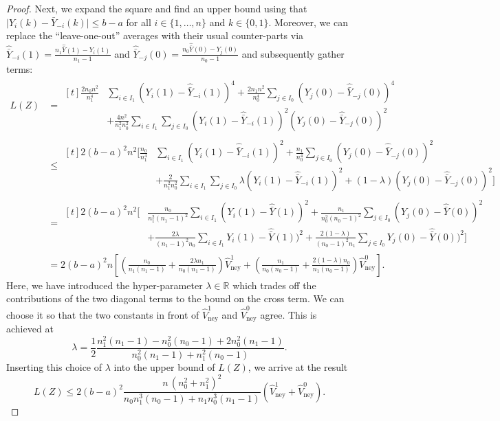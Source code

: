 \documentclass[aos]{imsart2}
\theoremstyle{plain}
\theoremstyle{definition}
\newcommand{\R}{\mathbb{R}}
\newcommand{\yb}{\bar{Y}}
\newcommand{\ybh}{\hat{\bar{Y}}}
\newcommand{\vhn}{\hat{V}_{\mathrm{ney}}}
\begin{document}
\begin{appendix}
\begin{proof}
     Next, we expand the square and find an upper bound using that $\lvert Y_i(k) - \yb_{-i}(k) \rvert \leq b-a$ for all $i \in \{1,\ldots,n\}$ and $k\in \{0,1\}$. Moreover, we can replace the ``leave-one-out'' averages with their usual counter-parts via $\ybh_{-i}(1)= \frac{n_1\ybh(1)-Y_i(1)}{n_1-1}$ and $\ybh_{-j}(0)= \frac{n_0\ybh(0)-Y_j(0)}{n_0-1}$ and subsequently gather terms:
     {\allowdisplaybreaks
    \begin{align*}
        L(Z) &= \begin{aligned}[t]
        \frac{2 n_0 n^2}{n_1^4} &\sum_{i \in I_1} (Y_i(1)-\ybh_{-i}(1))^4 + \frac{2 n_1 n^2}{n_0^4} \sum_{j \in I_0} (Y_j(0)-\ybh_{-j}(0))^4 \\
        &+ \frac{4n^2}{n_1^2 n_0^2} \sum_{i \in I_1} \sum_{j \in I_0} (Y_i(1)-\ybh_{-i}(1))^2 (Y_j(0)-\ybh_{-j}(0))^2
        \end{aligned}\\
        &\leq\begin{aligned}[t]
        2 (b-a)^2 n^2\Bigg[
        \frac{n_0}{n_1^4} &\sum_{i \in I_1} (Y_i(1)-\ybh_{-i}(1))^2 + \frac{n_1}{n_0^4} \sum_{j \in I_0} (Y_j(0)-\ybh_{-j}(0))^2 \\
        &+ \frac{2}{n_1^2 n_0^2} \sum_{i \in I_1} \sum_{j \in I_0} \lambda (Y_i(1)-\ybh_{-i}(1))^2 + (1-\lambda) (Y_j(0)-\ybh_{-j}(0))^2\Bigg]
        \end{aligned}\\
        &=\begin{aligned}[t]
        2 (b-a)^2 n^2\Bigg[
        &\frac{n_0}{n_1^2(n_1-1)^2} \sum_{i \in I_1} (Y_i(1)-\ybh(1))^2 + \frac{n_1}{n_0^2(n_0-1)^2} \sum_{j \in I_0} (Y_j(0)-\ybh(0))^2 \\
        & + \frac{2 \lambda}{(n_1-1)^2n_0} \sum_{i \in I_1} Y_i(1)-\ybh(1))^2 + \frac{2 (1-\lambda)}{(n_0-1)^2n_1} \sum_{j \in I_0} Y_j(0)-\ybh(0))^2\Bigg]
        \end{aligned}\\
        &=2(b-a)^2 n \left[\left(\frac{n_0}{n_1(n_1-1)} + \frac{2\lambda n_1}{n_0 (n_1-1)}\right) \vhn^1 + \left(\frac{n_1}{n_0(n_0-1)}+\frac{2(1-\lambda)n_0}{n_1(n_0-1)}\right) \vhn^0\right].
    \end{align*}
    }
    Here, we have introduced the hyper-parameter $\lambda \in \R$ which trades off the contributions of the two diagonal terms to the bound on the cross term. We can choose it so that the two constants in front of $\vhn^1$ and $\vhn^0$ agree. This is achieved at
    \begin{equation*}
        \lambda = \frac{1}{2} \frac{n_1^2(n_1-1) - n_0^2(n_0-1) + 2n_0^2(n_1-1)}{n_0^2(n_1-1)+n_1^2(n_0-1)}.
    \end{equation*}
    Inserting this choice of $\lambda$ into the upper bound of $L(Z)$, we arrive at the result
    \begin{equation*}
        L(Z) \leq 2 (b-a)^2 \frac{n\,(n_0^2+n_1^2)^2}{n_0n_1^3(n_0-1) + n_1 n_0^3(n_1-1)} (\vhn^1+\vhn^0).
    \end{equation*}
\end{proof}



\end{appendix}
\end{document}
